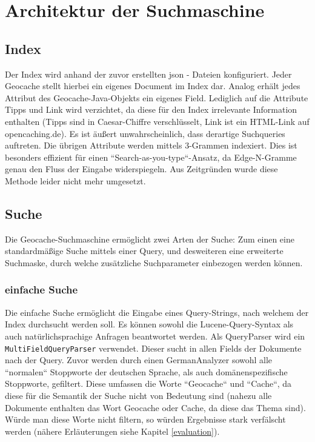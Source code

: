 \documentclass[11pt,a4paper]{scrreprt}
\renewcommand\emph[1]{\colorbox{light-gray}{\texttt{#1}}}
\begin{document}
\section{Architektur der Suchmaschine}

\subsection{Index}
Der Index wird anhand der zuvor erstellten json - Dateien konfiguriert. Jeder Geocache stellt hierbei ein eigenes Document im Index dar. Analog erhält jedes Attribut des Geocache-Java-Objekts ein eigenes Field. Lediglich auf die Attribute Tipps und Link wird verzichtet, da diese für den Index irrelevante Information enthalten (Tipps sind in Caesar-Chiffre verschlüsselt, Link ist ein HTML-Link auf opencaching.de). Es ist äußert unwahrscheinlich, dass derartige Suchqueries auftreten. Die übrigen Attribute werden mittels 3-Grammen indexiert. Dies ist besonders effizient für einen ``Search-as-you-type``-Ansatz, da Edge-N-Gramme genau den Fluss der Eingabe widerspiegeln. Aus Zeitgründen wurde diese Methode leider nicht mehr umgesetzt.

\subsection{Suche}
 Die Geocache-Suchmaschine ermöglicht zwei Arten der Suche: Zum einen eine standardmäßige Suche mittels einer Query, und desweiteren eine erweiterte Suchmaske, durch welche zusätzliche Suchparameter einbezogen werden können.

\subsubsection{einfache Suche}
Die einfache Suche ermöglicht die Eingabe eines Query-Strings, nach welchem der Index durchsucht werden soll. Es können sowohl die Lucene-Query-Syntax als auch natürlichsprachige Anfragen beantwortet werden. Als QueryParser wird ein \emph{MultiFieldQueryParser} verwendet. Dieser sucht in allen Fields der Dokumente nach der Query. Zuvor werden durch einen GermanAnalyzer sowohl alle ``normalen`` Stoppworte der deutschen Sprache, als auch domänenspezifische Stoppworte, gefiltert. Diese umfassen die Worte ``Geocache`` und ``Cache``, da diese für die Semantik der Suche nicht von Bedeutung sind (nahezu alle Dokumente enthalten das Wort Geocache oder Cache, da diese das Thema sind). Würde man diese Worte nicht filtern, so würden Ergebnisse stark verfälscht werden (nähere Erläuterungen siehe Kapitel \ref{evaluation}).
\end{document}
